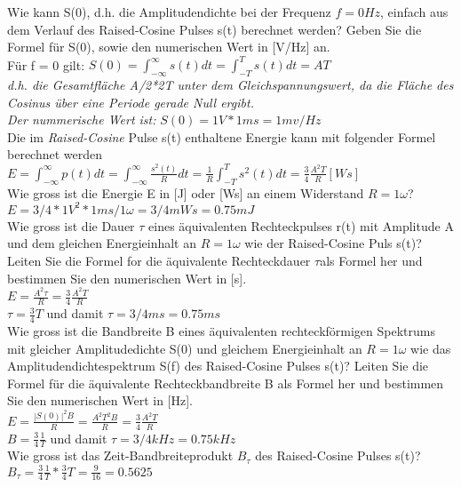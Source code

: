 Wie kann S(0), d.h. die Amplitudendichte bei der Frequenz $f=0 Hz$, einfach aus dem Verlauf des Raised-Cosine Pulses s(t) berechnet werden? Geben Sie die Formel für S(0),
sowie den numerischen Wert in [V/Hz] an.\\
Für f = 0 gilt: $S(0)=\int_{-\infty}^{\infty}s(t)dt=\int_{-T}^{T}s(t)dt=AT$\\
\textit{d.h. die Gesamtfläche A/2*2T unter dem Gleichspannungswert, da die Fläche des Cosinus über eine Periode gerade Null ergibt.}\\
\textit{Der nummerische Wert ist:} $S(0)=1V*1ms=1mv/Hz$\\

Die im \textit{Raised-Cosine} Pulse s(t) enthaltene Energie kann mit folgender Formel berechnet werden\\
$E=\int_{-\infty}^{\infty}p(t)dt=\int_{-\infty}^{\infty}\frac{s^2(t)}{R}dt=\frac{1}{R}\int_{-T}^{T}s^2(t)dt=\frac{3}{4}\frac{A^2T}{R}[Ws]$\\

Wie gross ist die Energie E in [J] oder [Ws] an einem Widerstand $R = 1 \omega$?\\
$E = 3/4 * 1 V^2 * 1ms / 1 \omega = 3/4 mWs = 0.75 mJ$\\

Wie gross ist die Dauer $\tau $ eines äquivalenten Rechteckpulses r(t) mit Amplitude A und dem gleichen Energieinhalt an $R = 1 \omega$ wie der Raised-Cosine Puls s(t)? Leiten Sie die Formel for die äquivalente Rechteckdauer $\tau $als Formel her und bestimmen Sie den numerischen Wert in [s].\\
$E=\frac{A^2 \tau }{R}=\frac{3}{4}\frac{A^2T}{R}$\\
$\tau=\frac{3}{4}T$ und damit $\tau=3/4 ms = 0.75ms$\\

Wie gross ist die Bandbreite B eines äquivalenten rechteckförmigen Spektrums mit gleicher Amplitudedichte S(0) und gleichem Energieinhalt an $R = 1 \omega$ wie das Amplitudendichtespektrum S(f) des Raised-Cosine Pulses s(t)? Leiten Sie die Formel für die äquivalente Rechteckbandbreite B als Formel her und bestimmen Sie den numerischen Wert in [Hz].\\
$E=\frac{|S(0)|^2B}{R}=\frac{A^2T^2B}{R}=\frac{3}{4}\frac{A^2T}{R}$\\
$B=\frac{3}{4}\frac{1}{T}$ und damit $\tau = 3/4 kHz = 0.75 kHz$\\

Wie gross ist das Zeit-Bandbreiteprodukt $B_{\tau}$ des Raised-Cosine Pulses s(t)?\\
$B_{\tau}=\frac{3}{4}\frac{1}{T}*\frac{3}{4}T=\frac{9}{16}=0.5625$

